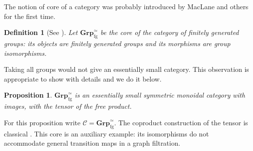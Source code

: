 \documentclass{amsart}
\newtheorem{proposition}[theorem]{Proposition}
\newtheorem{definition}[theorem]{Definition}
\begin{document}
The notion of core of a category was probably introduced by MacLane and others for the first time.

\begin{definition}[See \cite{ronbrown1, ronbrown2, maclane1998categories}]
    Let $\mathbf{Grp}_{\mathrm{fg}}^{\simeq}$ be the \textit{core} of the category of finitely generated groups: its objects are finitely generated groups and its morphisms are group isomorphisms. 
\end{definition}

Taking all groups would not give an essentially small category. This observation is appropriate to show with details and we do it below.

\begin{proposition}\label{niceproposition}
$\mathbf{Grp}_{\mathrm{fg}}^{\simeq}$ is an essentially small symmetric monoidal category with images, with the tensor of the free product. 
\end{proposition}

For this proposition write $\mathcal C=\mathbf{Grp}_{\mathrm{fg}}^{\simeq}$. The coproduct construction of the tensor is classical \cite[Sections~VII.1 and XI.1]{maclane1998categories}. This core is an auxiliary example: its isomorphisms do not accommodate general transition maps in a graph filtration.
\end{document}
